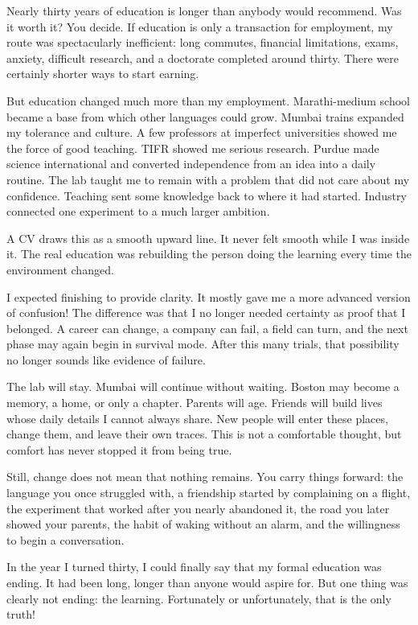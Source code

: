 \documentclass[11pt,twoside,openany]{book}
\newcommand{\scene}{\par\vspace{0.7em}{\centering\color{accent}\rule{0.85cm}{0.6pt}\par}\vspace{0.5em}\noindent\ignorespaces}
\begin{document}
\scene

Nearly thirty years of education is longer than anybody would recommend. Was
it worth it? You decide. If education is only a transaction for employment,
my route was spectacularly inefficient: long commutes, financial limitations,
exams, anxiety, difficult research, and a doctorate completed around thirty.
There were certainly shorter ways to start earning.

But education changed much more than my employment. Marathi-medium school
became a base from which other languages could grow. Mumbai trains expanded
my tolerance and culture. A few professors at imperfect universities showed
me the force of good teaching. TIFR showed me serious research. Purdue made
science international and converted independence from an idea into a daily
routine. The lab taught me to remain with a problem that did not care about
my confidence. Teaching sent some knowledge back to where it had started.
Industry connected one experiment to a much larger ambition.

A CV draws this as a smooth upward line. It never felt smooth while I was
inside it. The real education was rebuilding the person doing the learning
every time the environment changed.

\scene

I expected finishing to provide clarity. It mostly gave me a more advanced
version of confusion! The difference was that I no longer needed certainty as
proof that I belonged. A career can change, a company can fail, a field can
turn, and the next phase may again begin in survival mode. After this many
trials, that possibility no longer sounds like evidence of failure.

The lab will stay. Mumbai will continue without waiting. Boston may become a
memory, a home, or only a chapter. Parents will age. Friends will build lives
whose daily details I cannot always share. New people will enter these places,
change them, and leave their own traces. This is not a comfortable thought,
but comfort has never stopped it from being true.

Still, change does not mean that nothing remains. You carry things forward:
the language you once struggled with, a friendship started by complaining on
a flight, the experiment that worked after you nearly abandoned it, the road
you later showed your parents, the habit of waking without an alarm, and the
willingness to begin a conversation.

In the year I turned thirty, I could finally say that my formal education was
ending. It had been long, longer than anyone would aspire for. But one thing
was clearly not ending: the learning. Fortunately or unfortunately, that is
the only truth!
\end{document}
